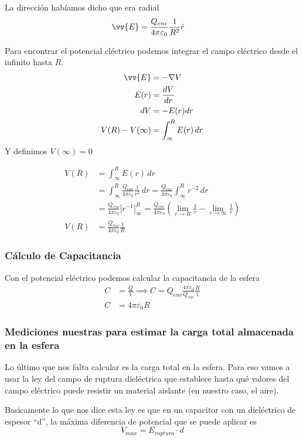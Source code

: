 \documentclass[12pt]{article}
\begin{document}
La dirección habíamos dicho que era radial
\begin{align*}
  \vv{E} &= \frac{Q_{enc}}{4\pi\varepsilon_0} \frac{1}{R^2} \hat{r}
\end{align*}

Para encontrar el potencial eléctrico podemos integrar el campo eléctrico desde el infinito hasta $ R $.
\begin{align*}
  \vv{E} &= -\nabla V\\
  E(r) &= \frac{dV}{dr}\\
  dV &= -E(r)dr\\
  V(R) - V(\infty) &= \int_{\infty}^{R} E(r) \,dr
\end{align*}
Y definimos $ V(\infty)=0 $

\begin{align*}
  V(R) &= \int_{\infty}^{R} E(r) \,dr\\
   &= \int_{\infty}^{R} \frac{Q_{enc}}{4\pi\varepsilon_0} \frac{1}{r^2} \,dr = \frac{Q_{enc}}{4\pi\varepsilon_0} \int_{\infty}^{R} r^{-2} \,dr\\
   &= \frac{Q_{enc}}{4\pi\varepsilon_0} \Bigg[r^{-1}\Bigg]_{\infty}^{R} = \frac{Q_{enc}}{4\pi\varepsilon_0} \left(\lim_{r \to R}\frac{1}{r} - \lim_{r \to \infty} \frac{1}{r}\right)\\
  V(R) &= \frac{Q_{enc}}{4\pi\varepsilon_0} \frac{1}{R}
\end{align*}

\subsubsection*{Cálculo de Capacitancia}
Con el potencial eléctrico podemos calcular la capacitancia de la esfera
\begin{align*}
  C &= \frac{Q}{V}  \implies C = Q_{enc} \frac{4\pi\varepsilon_0}{Q_{enc}} \frac{R}{1}\\
  C &= 4\pi\varepsilon_0R
\end{align*}

\subsubsection*{Mediciones nuestras para estimar la carga total almacenada en la esfera}
Lo último que nos falta calcular es la carga total en la esfera. Para eso vamos a usar la ley del campo de ruptura dieléctrica que establece hasta qué valores del campo eléctrico puede resistir un material aislante (en nuestro caso, el aire).

Basicamente lo que nos dice esta ley es que en un capacitor con un dieléctrico de espesor ``d'', la máxima diferencia de potencial que se puede aplicar es
\[
  V_{max} = E_{ruptura}\cdot d
\]
\end{document}
